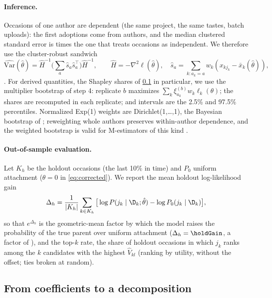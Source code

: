 \paragraph{Inference.}
Occasions of one author are dependent (the same project, the same tastes, batch uploads): the \nFirst{} first
adoptions come from \nFirstAuthors{} authors, and the median clustered standard error is \seClusterInfl{} times
the one that treats occasions as independent. We therefore use the cluster-robust sandwich
\[
  \widehat{\mathrm{Var}}(\hat\theta) = \hat H^{-1} \Big( \textstyle\sum_a \hat s_a \hat s_a^\top \Big) \hat H^{-1},
  \qquad \hat H = -\nabla^2 \ell(\hat\theta), \quad \hat s_a = \sum_{k: a_k = a} w_k (x_{kj_k} - \bar x_k(\hat\theta)),
\]
\citep{cameron2015practitioner}. For derived quantities, the Shapley shares of \cref{sec:shapley} in particular, we
use the multiplier bootstrap of step 4: replicate $b$ maximizes $\sum_k \xi^{(b)}_{a_k} w_k \ell_k(\theta)$; the
shares are recomputed in each replicate; and intervals are the 2.5\% and 97.5\% percentiles. Normalized Exp(1)
weights are Dirichlet(1,\dots,1), the Bayesian bootstrap of \citet{rubin1981bayesian}; reweighting whole authors
preserves within-author dependence, and the weighted bootstrap is valid for M-estimators of this kind
\citep{ma2005robust}.

\paragraph{Out-of-sample evaluation.}
Let $K_h$ be the holdout occasions (the last 10\% in time) and $P_0$ uniform attachment ($\theta = 0$ in
\eqref{eq:corrected}). We report the mean holdout log-likelihood gain
\[
  \Delta_h = \frac{1}{|K_h|} \sum_{k \in K_h} \big[ \log P(j_k \mid \D_k; \hat\theta) - \log P_0(j_k \mid \D_k)
  \big],
\]
so that $e^{\Delta_h}$ is the geometric-mean factor by which the model raises the probability of the true parent
over uniform attachment ($\Delta_h = \holdGain$, a factor of \holdGainTimes), and the top-$k$ rate, the share of
holdout occasions in which $j_k$ ranks among the $k$ candidates with the highest $\hat V_{kl}$ (ranking by
utility, without the offset; ties broken at random).

\subsection{From coefficients to a decomposition}
\label{sec:shapley}

